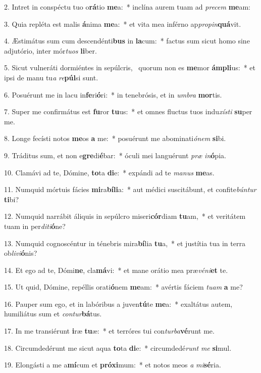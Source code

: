 2. Intret in conspéctu tuo o\textbf{rá}tio \textbf{me}a:~*  inclína aurem tuam ad \textit{pre}\textit{cem} \textbf{me}am:\

3. Quia repléta est malis \textbf{á}nima \textbf{me}a:~*  et vita mea inférno ap\textit{pro}\textit{pin}\textbf{quá}vit.\

4. Æstimátus sum cum descendénti\textbf{bus} in \textbf{la}cum:~*  factus sum sicut homo sine adjutório, inter mór\textit{tu}\textit{os} \textbf{li}ber.\

5. Sicut vulneráti dormiéntes in sepúlcris, \dag\  quorum non es \textbf{me}mor \textbf{ám}\textbf{pli}us:~*  et ipsi de manu tu\textit{a} \textit{re}\textbf{púl}si sunt.\

6. Posuérunt me in lacu in\textbf{fe}ri\textbf{ó}ri:~*  in tenebrósis, et in \textit{um}\textit{bra} \textbf{mor}tis.\

7. Super me confirmátus est \textbf{fu}ror \textbf{tu}us:~*  et omnes fluctus tuos indu\textit{xís}\textit{ti} \textbf{su}per me.\

8. Longe fecísti notos \textbf{me}os \textbf{a} me:~*  posuérunt me abominati\textit{ó}\textit{nem} \textbf{si}bi.\

9. Tráditus sum, et non e\textbf{gre}di\textbf{é}bar:~*  óculi mei languérunt \textit{præ} \textit{in}\textbf{ó}pia.\

10. Clamávi ad te, Dómine, \textbf{to}ta \textbf{di}e:~*  expándi ad te \textit{ma}\textit{nus} \textbf{me}as.\

11. Numquid mórtuis fácies \textbf{mi}ra\textbf{bí}\textbf{li}a:~*  aut médici suscitábunt, et confite\textit{bún}\textit{tur} \textbf{ti}bi?\

12. Numquid narrábit áliquis in sepúlcro miseri\textbf{cór}diam \textbf{tu}am,~*  et veritátem tuam in per\textit{di}\textit{ti}\textbf{ó}ne?\

13. Numquid cognoscéntur in ténebris mira\textbf{bí}lia \textbf{tu}a,~*  et justítia tua in terra ob\textit{li}\textit{vi}\textbf{ó}nis?\

14. Et ego ad te, Dómi\textbf{ne}, cla\textbf{má}vi:~*  et mane orátio mea præ\textit{vé}\textit{ni}\textbf{et} te.\

15. Ut quid, Dómine, repéllis orati\textbf{ó}nem \textbf{me}am:~*  avértis fáciem \textit{tu}\textit{am} \textbf{a} me?\

16. Pauper sum ego, et in labóribus a juven\textbf{tú}te \textbf{me}a:~*  exaltátus autem, humiliátus sum et \textit{con}\textit{tur}\textbf{bá}tus.\

17. In me transiérunt \textbf{i}ræ \textbf{tu}æ:~*  et terróres tui con\textit{tur}\textit{ba}\textbf{vé}runt me.\

18. Circumdedérunt me sicut aqua \textbf{to}ta \textbf{di}e:~*  circumdedé\textit{runt} \textit{me} \textbf{si}mul.\

19. Elongásti a me a\textbf{mí}cum et \textbf{pró}\textbf{xi}mum:~*  et notos meos \textit{a} \textit{mi}\textbf{sé}ria.\

